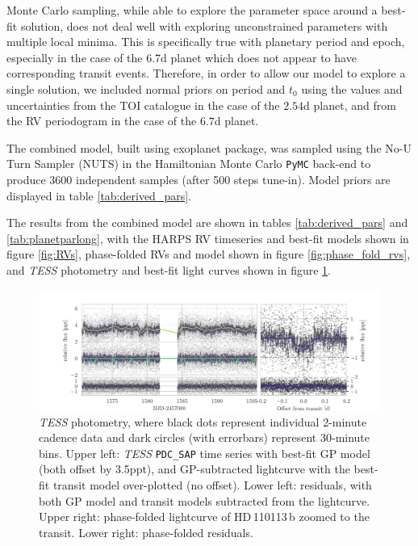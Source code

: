 \documentclass[fleqn,usenatbib]{mnras}
\newcommand{\tess}{{\it TESS}}
\newcommand{\harps}{{HARPS}}
\newcommand{\Tplanet}{HD\,110113\,b}
\begin{document}
Monte Carlo sampling, while able to explore the parameter space around a best-fit solution, does not deal well with exploring unconstrained parameters with multiple local minima. 
This is specifically true with planetary period and epoch, especially in the case of the 6.7d planet which does not appear to have corresponding transit events. 
Therefore, in order to allow our model to explore a single solution, we included normal priors on period and $t_0$ using the values and uncertainties from the TOI catalogue in the case of the $2.54$d planet, and from the RV periodogram in the case of the $6.7$d planet.

The combined model, built using \textsf{exoplanet} \citep{exoplanet} package, was sampled using the No-U Turn Sampler (NUTS) in the Hamiltonian Monte Carlo \texttt{PyMC} back-end \citep{exoplanet:pymc3} to produce 3600 independent samples (after 500 steps tune-in).
Model priors are displayed in table \ref{tab:derived_pars}.

The results from the combined model are shown in tables \ref{tab:derived_pars} and \ref{tab:planetparlong}, with the \harps{} RV timeseries and best-fit models shown in figure \ref{fig:RVs}, phase-folded RVs and model shown in figure \ref{fig:phase_fold_rvs}, and \tess{} photometry and best-fit light curves shown in figure \ref{fig:photometry}.

\begin{figure}
	\includegraphics[width=\textwidth, trim={1.45cm 0.2 0.95cm 0.5}]{Combined_phot_plot_3_GPs_nontransiting_c.pdf}
    \caption{\tess{} photometry, where black dots represent individual 2-minute cadence data and dark circles (with errorbars) represent 30-minute bins. Upper left: \tess{} \texttt{PDC\_SAP} time series with best-fit GP model (both offset by 3.5ppt), and GP-subtracted lightcurve with the best-fit transit model over-plotted (no offset). Lower left: residuals, with both GP model and transit models subtracted from the lightcurve. Upper right: phase-folded lightcurve of \Tplanet{} zoomed to the transit. Lower right: phase-folded residuals. }
    \label{fig:photometry}
\end{figure}
\end{document}
